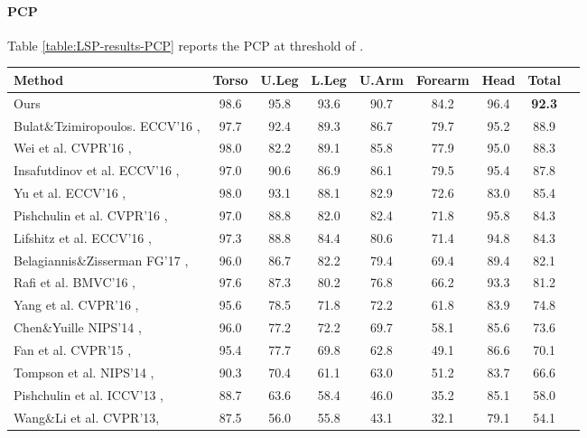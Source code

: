 \documentclass[journal ]{IEEEtran}
\begin{document}
\paragraph{PCP}
Table \ref{table:LSP-results-PCP} reports the PCP at threshold of .
\begin{table*}[t]
	\footnotesize
	\tabcolsep=0.2cm
	\begin{center}
		\begin{tabular}{l c c c c c c c c}
			\hline 
			Method & Torso & U.Leg & L.Leg & U.Arm & Forearm & Head & Total \\ [0.2ex]
			\hline
Ours & 98.6  & 95.8  & 93.6  & 90.7  & 84.2  & 96.4 & \textbf{92.3}   \\
			\hline
			
Bulat\&Tzimiropoulos. ECCV'16 \cite{bulat2016human},  &97.7 	&92.4 	&89.3 	&86.7 	&79.7 	&95.2 	&88.9 \\
			Wei et al. CVPR'16 \cite{wei2016convolutional}, &98.0 	&82.2 	&89.1 	&85.8 	&77.9  &95.0 &88.3 \\
			Insafutdinov et al. ECCV'16 \cite{insafutdinov2016deepercut},  &97.0 	&90.6 	&86.9 	&86.1 	&79.5 	&95.4 	&87.8 \\
			Yu et al. ECCV'16 \cite{yu2016deep},  &98.0 	&93.1 	&88.1 	&82.9 	&72.6 	&83.0 	&85.4 \\
			Pishchulin et al. CVPR'16 \cite{pishchulin2016deepcut},  &97.0 	&88.8 	&82.0 	&82.4 	&71.8 	&95.8 	&84.3 \\
			Lifshitz et al. ECCV'16 \cite{lifshitz2016human}, &97.3 	&88.8 	&84.4 &80.6 	&71.4 	&94.8 	&84.3 \\
			Belagiannis\&Zisserman FG'17 \cite{belagiannis2016recurrent}, &96.0 	&86.7 	&82.2 	&79.4 	&69.4 	&89.4 	&82.1 \\
			Rafi et al. BMVC'16 \cite{rafi2016efficient},  &97.6 	&87.3 	&80.2 	&76.8 	&66.2 	&93.3 	&81.2 \\
			Yang et al. CVPR'16 \cite{yang2016end}, &95.6 	&78.5 	&71.8 	&72.2 	&61.8 	&83.9 	&74.8 \\
			Chen\&Yuille NIPS'14 \cite{chen2014articulated}, &96.0 	&77.2 	&72.2 	&69.7 	&58.1 	&85.6 	&73.6 \\
			Fan et al. CVPR'15 \cite{fan2015combining}, &95.4 	&77.7 	&69.8 	&62.8 	&49.1 	&86.6 	&70.1 \\
			Tompson et al. NIPS'14 \cite{tompson2014joint}, &90.3 	&70.4 	&61.1 	&63.0 	&51.2 	&83.7 	&66.6 \\
			Pishchulin et al. ICCV'13 \cite{pishchulin2013strong}, &88.7 	&63.6 	&58.4 	&46.0 	&35.2 	&85.1 	&58.0 \\
			Wang\&Li et al. CVPR'13\cite{fwang2013pose}, &87.5 	&56.0 	&55.8 	&43.1 	&32.1 	&79.1 	&54.1 \\
\hline
\end{tabular}
	\end{center}
	\caption{Comparisons of PCP@0.5 score on the LSP test set.}
	\label{table:LSP-results-PCP}
\end{table*}
\end{document}

